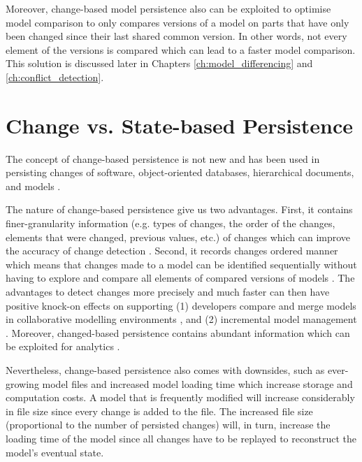 Moreover, change-based model persistence also can be exploited to optimise model comparison to only compares versions of a model on parts that have only been changed since their last shared common version. In other words, not every element of the versions is compared which can lead to a faster model comparison. This solution is discussed later in Chapters \ref{ch:model_differencing} and \ref{ch:conflict_detection}. 

\section{Change vs. State-based Persistence}
\label{sec:change_based_vs_state_based_persistence}
The concept of change-based persistence is not new and has been used in persisting changes of software, object-oriented databases, hierarchical documents, and models 
\cite{DBLP:journals/entcs/RobbesL07,DBLP:conf/sde/LippeO92,DBLP:conf/caise/IgnatN05,koegel2010emfstore}. 

The nature of change-based persistence give us two advantages. First, it contains finer-granularity information (e.g. types of changes, the order of the changes, elements that were changed, previous values, etc.) of changes which can improve the accuracy of change detection \cite{DBLP:journals/entcs/RobbesL07,DBLP:conf/sde/LippeO92,DBLP:conf/caise/IgnatN05,mens2002state}. Second, it records changes ordered manner which means that changes made to a model can be identified sequentially without having to explore and compare all elements of compared versions of models \cite{DBLP:conf/edoc/KoegelHLHD10}. The advantages to detect changes more precisely and much faster can then have positive knock-on effects on supporting (1) developers compare and merge models in collaborative modelling environments \cite{DBLP:conf/sde/LippeO92,DBLP:conf/caise/IgnatN05,koegel2010emfstore}, and (2) incremental model management \cite{jouault2010towards,DBLP:conf/ecmdafa/OgunyomiRK15, DBLP:conf/ecmdafa/RathHV12}. Moreover, changed-based persistence contains abundant information which can be exploited for analytics \cite{DBLP:journals/entcs/RobbesL07}.


Nevertheless, change-based persistence also comes with downsides, such as ever-growing model files 
\cite{DBLP:journals/entcs/RobbesL07,DBLP:conf/edoc/KoegelHLHD10} and increased model loading time \cite{mens2002state}
which increase storage and computation costs. A model that is frequently modified will increase considerably in file size 
since every change is added to the file. The increased file size (proportional to the number of persisted changes) will, 
in turn, increase the loading time of the model since all changes have to be replayed to reconstruct the model's 
eventual state. 

